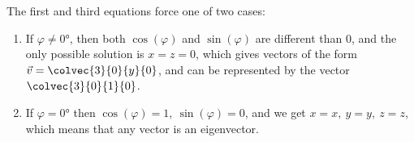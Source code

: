 {\begin{answer}
		The first and third equations force one of two cases:
		\begin{enumerate}
			\item If $\varphi\neq\ang{0}$, then both $\cos(\varphi)$ and $\sin(\varphi)$ are different than $0$, and the only possible solution is $x=z=0$, which gives vectors of the form $\vec{v}=\colvec{3}{0}{y}{0}$, and can be represented by the vector $\colvec{3}{0}{1}{0}$.
			\item If $\varphi=\ang{0}$ then $\cos(\varphi)=1,\ \sin(\varphi)=0$, and we get $x=x,\ y=y,\ z=z$, which means that any vector is an eigenvector.
		\end{enumerate}
	\end{answer}
}\fi
